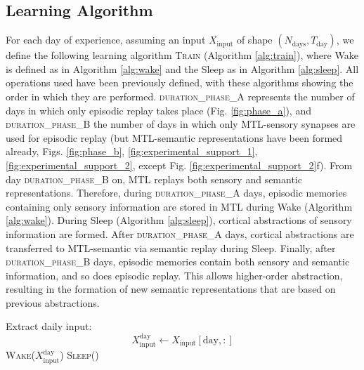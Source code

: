 \documentclass{article}
\begin{document}
\subsection*{Learning Algorithm}
For each day of experience, assuming an input $X_\textrm{input}$ of shape $(N_\textrm{days}, T_\textrm{day})$, we define the following learning algorithm \textsc{Train} (Algorithm \ref{alg:train}), where \textrm{Wake} is defined as in Algorithm \ref{alg:wake} and the \textrm{Sleep} as in Algorithm \ref{alg:sleep}. All operations used have been previously defined, with these algorithms showing the order in which they are performed. \textsc{duration\_phase\_A} represents the number of days in which only episodic replay takes place (Fig. \ref{fig:phase_a}), and  \textsc{duration\_phase\_B} the number of days in which only MTL-sensory synapses are used for episodic replay (but MTL-semantic representations have been formed already, Figs. \ref{fig:phase_b}, \ref{fig:experimental_support_1}, \ref{fig:experimental_support_2}, except Fig. \ref{fig:experimental_support_2}f). From day \textsc{duration\_phase\_B} on, MTL replays both sensory and semantic representations. Therefore, during \textsc{duration\_phase\_A} days, episodic memories containing only sensory information are stored in MTL during Wake (Algorithm \ref{alg:wake}). During Sleep (Algorithm \ref{alg:sleep}), cortical abstractions of sensory information are formed. After \textsc{duration\_phase\_A} days, cortical abstractions are transferred to MTL-semantic via semantic replay during Sleep. Finally, after \textsc{duration\_phase\_B} days, episodic memories contain both sensory and semantic information, and so does episodic replay. This allows higher-order abstraction, resulting in the formation of new semantic representations that are based on previous abstractions.
\begin{algorithm}[h!]
\caption{Learning Algorithm Per Day}\label{alg:train}
\begin{algorithmic}[1]
        \State Extract daily input:
            \[
            X^{\textrm{day}}_\textrm{input} \gets X_\textrm{input}[\textrm{day},:]
            \]
        \State \textsc{Wake}($X^{\textrm{day}}_\textrm{input}$)
        \State \textsc{Sleep}()
    \EndFor
\EndFunction
\end{algorithmic}
\end{algorithm}
\end{document}
